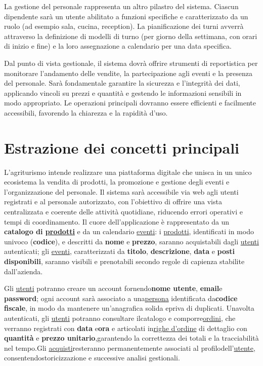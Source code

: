 \documentclass[a4paper,12pt]{report}
\begin{document}
La gestione del personale rappresenta un altro pilastro del sistema.
Ciascun dipendente sarà un utente abilitato a funzioni specifiche e
caratterizzato da un ruolo (ad esempio sala, cucina, reception). La
pianificazione dei turni avverrà attraverso la definizione di modelli
di turno (per giorno della settimana, con orari di inizio e fine) e
la loro assegnazione a calendario per una data specifica.

Dal punto di vista gestionale, il sistema dovrà offrire strumenti di
reportistica per monitorare l'andamento delle vendite, la
partecipazione agli eventi e la presenza del personale. Sarà
fondamentale garantire la sicurezza e l'integrità dei dati,
applicando vincoli su prezzi e quantità e gestendo le informazioni
sensibili in modo appropriato. Le operazioni principali dovranno
essere efficienti e facilmente accessibili, favorendo la chiarezza e
la rapidità d'uso.

\section{Estrazione dei concetti principali}
L'agriturismo intende realizzare una piattaforma digitale che unisca
in un unico ecosistema la vendita di prodotti, la promozione e
gestione degli eventi e l'organizzazione del personale. Il sistema
sarà accessibile via web agli utenti registrati e al personale
autorizzato, con l'obiettivo di offrire una vista centralizzata e
coerente delle attività quotidiane, riducendo errori operativi e
tempi di coordinamento. Il cuore dell'applicazione è rappresentato da
un \textbf{catalogo di \underline{prodotti}} e da un calendario
\underline{eventi}: i \underline{prodotti}, identificati in modo
univoco (\textbf{codice}), e descritti da \textbf{nome} e
\textbf{prezzo}, saranno acquistabili dagli \underline{utenti}
autenticati; gli \underline{eventi}, caratterizzati da
\textbf{titolo}, \textbf{descrizione}, \textbf{data} e \textbf{posti
disponibili}, saranno visibili e prenotabili secondo regole di
capienza stabilite dall'azienda.

Gli \underline{utenti} potranno creare un account
fornendo\textbf{nome utente}, \textbf{email}e \textbf{password}; ogni
account sarà associato a una\underline{persona} identificata
da\textbf{codice fiscale}, in modo da mantenere un'anagrafica solida
epriva di duplicati. Unavolta autenticati, gli \underline{utenti}
potranno consultare ilcatalogo e comporre\underline{ordini}, che
verranno registrati con \textbf{data} e\textbf{ora} e articolati
in\underline{righe d'ordine} di dettaglio con \textbf{quantità}
e \textbf{prezzo unitario},garantendo la correttezza dei totali e la
tracciabilità nel tempo.Gli \underline{acquisti}resteranno
permanentemente associati al profilodell'\underline{utente},
consentendostoricizzazione e successive analisi gestionali.
\end{document}

